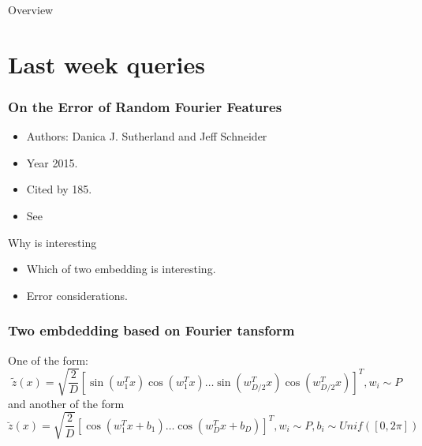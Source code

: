 


\begin{frame}{Overview}
  \tableofcontents
\end{frame}
\section{Last week queries}
\begin{frame}
  \frametitle{On the Error of Random Fourier Features}

  \begin{itemize}
    \item Authors: Danica J. Sutherland and Jeff Schneider
    \item Year 2015.
    \item Cited by 185. 
    \item See \cite{sutherland2015error}
  \end{itemize}

  Why is interesting
  \begin{itemize}
    \item Which of two embedding is interesting. 
    \item Error considerations.  
  \end{itemize}

\end{frame}

\begin{frame}
  \frametitle{Two embdedding based on Fourier tansform}
  
  One of the form: 
  \begin{equation}
    \tilde{z}(x) = \sqrt{\frac{2}{D}}
    [\sin(w_1^T x) \cos(w_1^T x) \ldots \sin(w_{D/2}^T x) \cos(w_{D/2}^T x)]^T, w_i \sim P
  \end{equation}
  and another of the form 
  \begin{equation}
    \breve{z}(x) = \sqrt{\frac{2}{D}}
    [\cos(w_1^T x + b_1) \ldots \cos(w_{D}^T x + b_D)]^T, w_i \sim P, b_i \sim Unif([0, 2\pi])
  \end{equation}

\end{frame}

